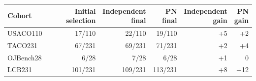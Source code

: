 \begin{tabular}{@{}lrrrrr@{}}
\toprule
Cohort & Initial selection & \shortstack{Independent\\final} & \shortstack{PN\\final} & \shortstack{Independent\\gain} & \shortstack{PN\\gain} \\
\midrule
USACO110 & 17/110 & 22/110 & 19/110 & +5 & +2 \\
TACO231 & 67/231 & 69/231 & 71/231 & +2 & +4 \\
OJBench28 & 6/28 & 7/28 & 6/28 & +1 & 0 \\
LCB231 & 101/231 & 109/231 & 113/231 & +8 & +12 \\
\bottomrule
\end{tabular}
